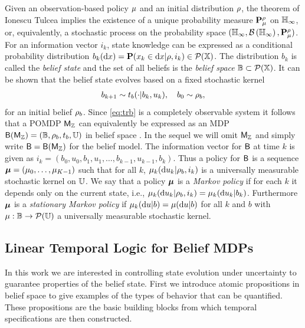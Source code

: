 \documentclass{ifacconf}
\begin{document}
Given an observation-based policy ${\mu}$ and an initial distribution $\rho$, the theorem of Ionescu Tulcea \citep{hll1996} implies the existence of a unique probability measure $\mathbf{P}_{\mu}^\rho$ on ${\mathbb{H}}_\infty$, or, equivalently, a stochastic process on the probability space $({\mathbb{H}}_\infty, \mathcal{B}\left({\mathbb{H}}_\infty\right), \mathbf{P}_{\mu}^\rho)$. For an information vector $i_k$, state knowledge can be expressed as a conditional probability distribution $b_k( \mathrm{d} x )=\mathbf{P}(x_k\in \mathrm{d} x |\rho,i_k)\in \mathcal P ({\mathbb{X}})$. The distribution $b_k$ is called the \emph{belief state} and the set of all beliefs is the \emph{belief space} $\mathbb{B}\subset \mathcal P({\mathbb{X}})$. It can be shown that the belief state evolves based on a fixed stochastic kernel
\begin{align}
\label{eq:trb}
	 b_{k+1} \sim t_b(\cdot|b_k,u_k), \quad b_0 \sim \rho_b,
\end{align}
for an initial belief $\rho_b$. Since \eqref{eq:trb} is a completely observable system it follows that a POMDP $\mathsf{M}_{{\mathbb{Z}}}$ can equivalently be expressed as an MDP $\mathsf{B}(\mathsf{M}_{{\mathbb{Z}}}) = (\mathbb{B}, \rho_b, t_b, {\mathbb{U}})$ in belief space \citep{bertsekas2004stochastic}. In the sequel we will omit $\mathsf{M}_{{\mathbb{Z}}}$ and simply write $\mathsf{B} = \mathsf{B}(\mathsf{M}_{{\mathbb{Z}}})$ for the belief model. The information vector for $\mathsf{B}$ at time $k$ is given as $i_k=(b_0, u_0, b_1, u_1, \ldots, b_{k-1}, u_{k-1}, b_k)$. Thus a policy for $\mathsf{B}$ is a sequence ${\boldsymbol{\mu}}=({\mu}_0,\ldots,{\mu}_{K-1})$ such that for all $k$, ${\mu}_k(\mathrm{d}u_k|\rho_b, i_k)$ is a universally measurable stochastic kernel on ${\mathbb{U}}$.	We say that a policy ${\boldsymbol{\mu}}$ is a \emph{Markov policy} if for each $k$ it depends only on the current state, i.e., ${\mu}_k(\mathrm{d} u_k|\rho_b, i_k) = {\mu}_k(\mathrm{d} u_k| b_k)$. Furthermore ${\boldsymbol{\mu}}$ is a \emph{stationary Markov policy} if ${\mu}_k(\mathrm{d} u| b)=  {\mu}(\mathrm{d} u| b)$  for all $k$ and $b$ with ${\mu}:\mathbb B\rightarrow \mathcal{P}({\mathbb{U}})$ a universally measurable stochastic kernel. %


\subsection{Linear Temporal Logic for Belief MDPs}

In this work we are interested in controlling state evolution under uncertainty to guarantee properties of the belief state. First we introduce atomic propositions in belief space to give examples of the types of behavior that can be quantified. These propositions are the basic building blocks from which temporal specifications are then constructed.
\end{document}
